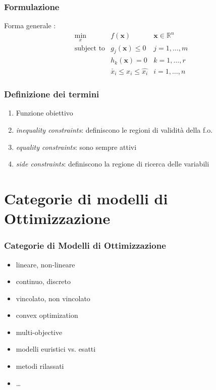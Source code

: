 \documentclass{beamer}
\begin{document}
\begin{frame}
\frametitle{Formulazione}
 Forma generale \cite{vanderplaats1984numerical}:
	\begin{eqnarray}
	\underset{x}{\text{min}} & f(\mathbf{x}) & \mathbf{x} \in \mathbb{R}^n \\
	\text{subject to} & g_j(\mathbf{x}) \leq 0 & j=1,\ldots, m \\
	& h_k(\mathbf{x}) = 0 & k=1,\ldots, r \\
	&  \check{x_i} \leq x_i \leq \hat{x_i}  & i=1,\ldots, n
	\end{eqnarray}
\end{frame}


\begin{frame}
	\frametitle{Definizione dei termini}
	\begin{enumerate}
		\item Funzione obiettivo
		\item \textit{inequality constraints}: definiscono le regioni di validit\`{a} della f.o.
		\item \textit{equality constraints}: sono sempre attivi
		\item \textit{side constraints}: definiscono la regione di ricerca delle variabili
	\end{enumerate}
\end{frame}



\section{Categorie di modelli di Ottimizzazione}


\begin{frame}
	\frametitle{Categorie di Modelli di Ottimizzazione}
	\begin{itemize}
		\item lineare, non-lineare \cite{vanderbei2014linear}
		\item continuo, discreto
		\item vincolato, non vincolato 
		\item convex optimization \cite{boyd2004convex}
		\item multi-objective \cite{desideri2010}
		\item modelli euristici vs. esatti
		\item metodi rilassati
		\item \ldots
	\end{itemize}
\end{frame}
\end{document}
